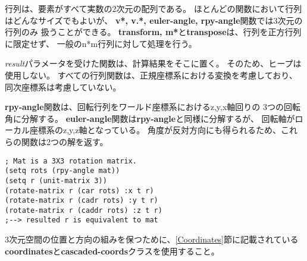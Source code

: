 行列は、要素がすべて実数の2次元の配列である。
ほとんどの関数において行列はどんなサイズでもよいが、
{\bf v*, v.*, euler-angle, rpy-angle}関数では3次元の行列のみ
扱うことができる。
{\bf transform, m*}と{\bf transpose}は、行列を正方行列に限定せず、
一般のn*m行列に対して処理を行う。

{\em result}パラメータを受けた関数は、計算結果をそこに置く。
そのため、ヒープは使用しない。
すべての行列関数は、正規座標系における変換を考慮しており、
同次座標系は考慮していない。

{\bf rpy-angle}関数は、回転行列をワールド座標系におけるz,y,x軸回りの
3つの回転角に分解する。
{\bf euler-angle}関数は{\bf rpy-angle}と同様に分解するが、
回転軸がローカル座標系のz,y,z軸となっている。
角度が反対方向にも得られるため、これらの関数は2つの解を返す。

\begin{verbatim}
; Mat is a 3X3 rotation matrix.
(setq rots (rpy-angle mat))
(setq r (unit-matrix 3))
(rotate-matrix r (car rots) :x t r)
(rotate-matrix r (cadr rots) :y t r)
(rotate-matrix r (caddr rots) :z t r)
;--> resulted r is equivalent to mat
\end{verbatim}

3次元空間の位置と方向の組みを保つために、\ref{Coordinates}節に記載されている
{\bf coordinates}と{\bf cascaded-coords}クラスを使用すること。

